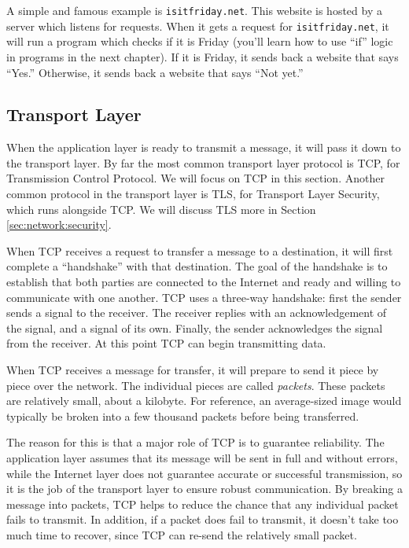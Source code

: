A simple and famous example is \texttt{isitfriday.net}. This website is hosted by a server which listens for requests. When it gets a request for \texttt{isitfriday.net}, it will run a program which checks if it is Friday (you'll learn how to use ``if'' logic in programs in the next chapter). If it is Friday, it sends back a website that says ``Yes.'' Otherwise, it sends back a website that says ``Not yet.''

\subsection{Transport Layer}

When the application layer is ready to transmit a message, it will pass it down to the transport layer. By far the most common transport layer protocol is TCP, for Transmission Control Protocol. We will focus on TCP in this section. Another common protocol in the transport layer is TLS, for Transport Layer Security, which runs alongside TCP. We will discuss TLS more in Section \ref{sec:network:security}.

When TCP receives a request to transfer a message to a destination, it will first complete a ``handshake'' with that destination. The goal of the handshake is to establish that both parties are connected to the Internet and ready and willing to communicate with one another. TCP uses a three-way handshake: first the sender sends a signal to the receiver. The receiver replies with an acknowledgement of the signal, and a signal of its own. Finally, the sender acknowledges the signal from the receiver. At this point TCP can begin transmitting data.

When TCP receives a message for transfer, it will prepare to send it piece by piece over the network. The individual pieces are called \emph{packets}. These packets are relatively small, about a kilobyte. For reference, an average-sized image would typically be broken into a few thousand packets before being transferred. 

The reason for this is that a major role of TCP is to guarantee reliability. The application layer assumes that its message will be sent in full and without errors, while the Internet layer does not guarantee accurate or successful transmission, so it is the job of the transport layer to ensure robust communication. By breaking a message into packets, TCP helps to reduce the chance that any individual packet fails to transmit. In addition, if a packet does fail to transmit, it doesn't take too much time to recover, since TCP can re-send the relatively small packet.

